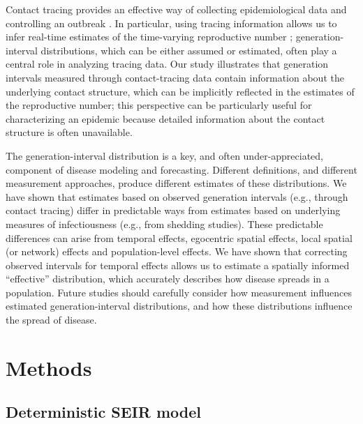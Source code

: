 \documentclass[12pt]{article}
\begin{document}
Contact tracing provides an effective way of collecting epidemiological data and controlling an outbreak \citep{clarke1998contact, eames2003contact, donnelly2003epidemiological}.
In particular, using tracing information allows us to infer real-time estimates of the time-varying reproductive number \citep{cauchemez2006estimating, hens2012robust, jewell2012enhancing, soetens2018real};
generation-interval distributions, which can be either assumed or estimated, often play a central role in analyzing tracing data.
Our study illustrates that generation intervals measured through contact-tracing data contain information about the underlying contact structure, which can be implicitly reflected in the estimates of the reproductive number;
this perspective can be particularly useful for characterizing an epidemic because detailed information about the contact structure is often unavailable.

The generation-interval distribution is a key, and often under-appreciated, component of disease modeling and forecasting.
Different definitions, and different measurement approaches, produce different estimates of these distributions.
We have shown that estimates based on observed generation intervals (e.g., through contact tracing) differ in predictable ways from estimates based on underlying measures of infectiousness (e.g., from shedding studies).
These predictable differences can arise from temporal effects, egocentric spatial effects, local spatial (or network) effects and population-level effects.
We have shown that correcting observed intervals for temporal effects allows us to estimate a spatially informed ``effective'' distribution, which accurately describes how disease spreads in a population. 
Future studies should carefully consider how measurement influences estimated generation-interval distributions, and how these distributions influence the spread of disease. 

\section{Methods}

\subsection{Deterministic SEIR model}
\end{document}
